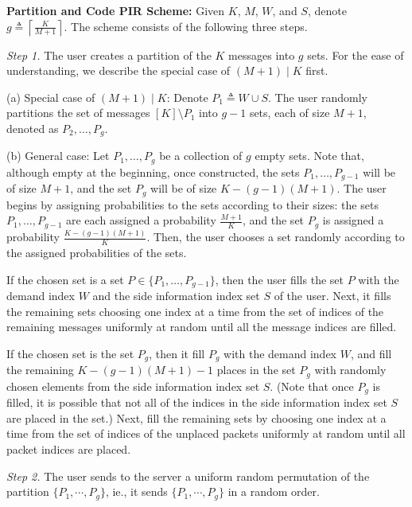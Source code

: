 \documentclass[letterpaper, 10 pt, conference]{ieeeconf}
\begin{document}

{\bf Partition and Code PIR Scheme:} Given $K$, $M$, $W$, and $S$, denote $g\triangleq\left\lceil \frac{K}{M+1} \right\rceil$. The scheme consists of the following three steps.

{\it Step 1.} The user creates a partition of the $K$ messages into $g$ sets. For the ease of understanding, we describe the special case of $(M+1)\mid K$ first. 

(a) Special case of $(M+1)\mid K$: Denote $P_{1}\triangleq W \cup S$. The user randomly partitions the set of messages $[K] \setminus P_{1}$ into $g-1$ sets, each of size $M+1$, denoted as $P_2,\dots,P_{g}$.

(b) General case: %
Let $P_1,\dots,P_{g}$ be a collection of $g$ empty sets. Note that, although empty at the beginning, once constructed, the sets $P_1,\dots,P_{g-1}$ will be of size $M+1$, and the set $P_g$ will be of size $K - (g-1)(M+1)$.
The user begins by assigning probabilities to the sets according to their sizes: the sets $P_1,\dots,P_{g-1}$ are each assigned a probability $\frac{M+1}{K}$, and the set $P_g$ is assigned a probability $\frac{K - (g-1)(M+1)}{K}$. Then, the user chooses a set randomly according to the assigned probabilities of the sets. 

If the chosen set is a set $P\in \{P_1,\dots,P_{g-1}\}$, then the user fills the set $P$ with the demand index $W$ and the side information index set $S$ of the user. Next, it fills the remaining sets choosing one index at a time from the set of indices of the remaining messages uniformly at random until all the message indices are filled. 

If the chosen set is the set $P_g$, then it fill $P_g$ with the demand index $W$, and fill the remaining \mbox{$K - (g-1)(M+1)-1$} places in the set $P_g$ with randomly chosen elements from the side information index set $S$. (Note that once $P_g$ is filled, it is possible that not all of the indices in the side information index set $S$ are placed in the set.) Next, fill the remaining sets by choosing one index at a time from the set of indices of the unplaced packets uniformly at random until all packet indices are placed. 


{\it Step 2.} The user sends to the server a uniform random permutation of the partition $\{P_1,\cdots,P_g\}$, ie., it sends $\{P_1, \cdots, P_g\}$ in a random order. %
\end{document}
